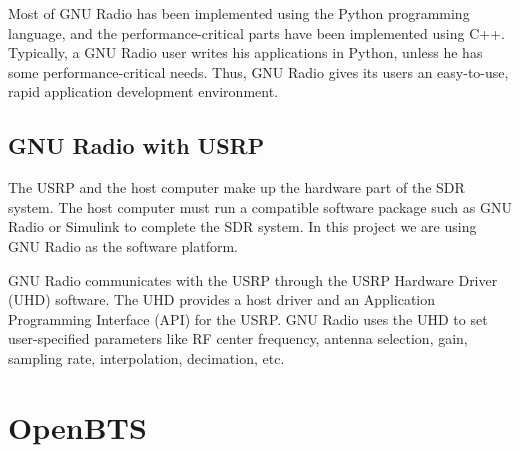 Most of GNU Radio has been implemented using the Python programming language, and the performance-critical parts have been implemented using C++. Typically, a GNU Radio user writes his applications in Python, unless he has some performance-critical needs. Thus, GNU Radio gives its users an easy-to-use, rapid application development environment.

\subsection{GNU Radio with USRP}
The USRP and the host computer make up the hardware part of the SDR system. The host computer must run a compatible software package such as GNU Radio or Simulink to complete the SDR system. In this project we are using GNU Radio as the software platform.

GNU Radio communicates with the USRP through the USRP Hardware Driver (UHD) software. The UHD provides a host driver and an Application Programming Interface (API) for the USRP. GNU Radio uses the UHD to set user-specified parameters like RF center frequency, antenna selection, gain, sampling rate, interpolation, decimation, etc.



\section{OpenBTS}
